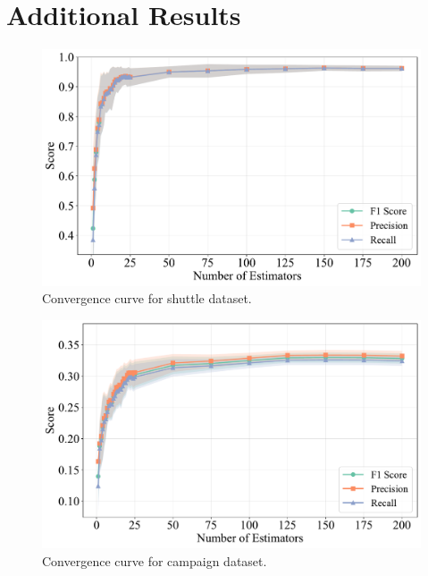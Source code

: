 \documentclass[10pt, conference]{IEEEtran}
\begin{document}
\section{Additional Results}
\begin{figure}[H]
	\centering
	\includegraphics[width=\linewidth]{../results/shuttle/n_estimators/convergence_curve.pdf}
	\caption{Convergence curve for shuttle dataset.}
	\label{fig:n_estimators_shuttle}
\end{figure}
\begin{figure}[H]
	\centering
	\includegraphics[width=\linewidth]{../results/campaign/n_estimators/convergence_curve.pdf}
	\caption{Convergence curve for campaign dataset.}
	\label{fig:n_estimators_campaign}
\end{figure}
\end{document}
